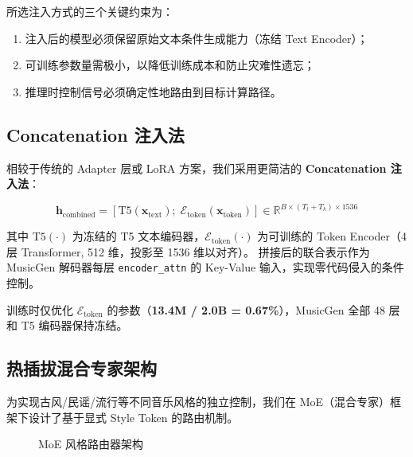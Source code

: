 \documentclass[12pt,a4paper]{article}
\begin{document}
所选注入方式的三个关键约束为：
\begin{enumerate}
\item 注入后的模型必须保留原始文本条件生成能力（冻结 Text Encoder）；
\item 可训练参数量需极小，以降低训练成本和防止灾难性遗忘；
\item 推理时控制信号必须确定性地路由到目标计算路径。
\end{enumerate}

\subsection{Concatenation 注入法}

相较于传统的 Adapter 层或 LoRA 方案，我们采用更简洁的 \textbf{Concatenation 注入法}：

\begin{equation}
\mathbf{h}_{\text{combined}} = [\text{T5}(\mathbf{x}_{\text{text}});\; \mathcal{E}_{\text{token}}(\mathbf{x}_{\text{token}})] \in \mathbb{R}^{B \times (T_t+T_k) \times 1536}
\end{equation}

其中 $\text{T5}(\cdot)$ 为冻结的 T5 文本编码器，$\mathcal{E}_{\text{token}}(\cdot)$ 为可训练的 Token Encoder（4 层 Transformer, 512 维，投影至 1536 维以对齐）。
拼接后的联合表示作为 MusicGen 解码器每层 \texttt{encoder\_attn} 的 Key-Value 输入，实现零代码侵入的条件控制。

训练时仅优化 $\mathcal{E}_{\text{token}}$ 的参数（\textbf{13.4M / 2.0B = 0.67\%}），MusicGen 全部 48 层和 T5 编码器保持冻结。

\subsection{热插拔混合专家架构}

为实现古风/民谣/流行等不同音乐风格的独立控制，我们在 MoE（混合专家）框架下设计了基于显式 Style Token 的路由机制。

\begin{figure}[H]
\centering
{}
\caption{MoE 风格路由器架构}
\label{fig:moe}
\end{figure}
\end{document}
